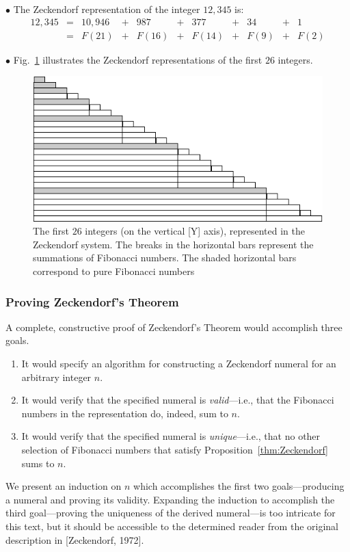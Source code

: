 \noindent $\bullet$
The Zeckendorf representation of the integer $12,345$ is:
\[ \begin{array}{ccccccccccc}
12,345 & =  & 10,946 & + & 987    & +  &   377  & + & 34   & + & 1 \\
            & =  & F(21)  & + & F(16)  & +  & F(14) & + & F(9) & + & F(2)
\end{array} \]     

\medskip

\noindent $\bullet$
Fig.~\ref{fig:zeckendorf} illustrates the Zeckendorf representations of the first $26$ integers. 
\begin{figure}[h]
\begin{center}
        \includegraphics[scale=0.5]{FiguresArithmetic/Zeckendorf}
        \caption{The first $26$ integers (on the vertical [Y] axis), represented in the Zeckendorf system.  The breaks in the horizontal bars represent the summations of Fibonacci numbers.  The shaded horizontal bars correspond to pure Fibonacci numbers}
\label{fig:zeckendorf}
\end{center}
\end{figure}

\subsubsection{Proving Zeckendorf's Theorem}
\label{sec:Zeckendorf-proof}

A complete, constructive proof of Zeckendorf's Theorem would accomplish three goals.
\begin{enumerate}
\item
It would specify an algorithm for constructing a Zeckendorf numeral for an arbitrary integer $n$.
\item
It would verify that the specified numeral is {\em valid}---i.e., that the Fibonacci numbers in the representation do, indeed, sum to $n$.
\item
It would verify that the specified numeral is {\em unique}---i.e., that no other selection of Fibonacci numbers that satisfy Proposition~\ref{thm:Zeckendorf} sums to $n$.
\end{enumerate}
We present an induction on $n$ which accomplishes the first two goals---producing a numeral and proving its validity.  Expanding the induction to accomplish the third goal---proving the uniqueness of the derived numeral---is too intricate for this text, but it should be accessible to the determined reader from the original description in  [Zeckendorf, 1972].

